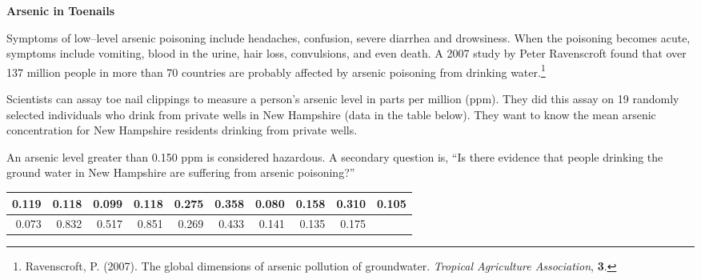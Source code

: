 \def\theTopic{Arsenic}
\def\dayNum{15 }

\begin{center}
{\bf {\large Arsenic in Toenails}}
\end{center}

 Symptoms of low--level  arsenic poisoning
include headaches, confusion, severe diarrhea and
drowsiness.  When the poisoning becomes acute, symptoms include
vomiting, blood in the urine, hair loss, convulsions, and even death.
A 2007 study by Peter Ravenscroft found that over 137 million people
in more than 70 countries are probably affected by arsenic poisoning
from drinking water.\footnote{Ravenscroft, P. (2007). The global
  dimensions of arsenic pollution of groundwater. {\em Tropical
    Agriculture Association}, {\bf 3}.}

Scientists can assay toe nail clippings to measure a person's arsenic
level in parts per million (ppm).  They did this assay on 19 randomly selected 
individuals who drink from private wells in New Hampshire (data in the
table below). They want to know  the mean arsenic 
concentration for New Hampshire residents drinking from private wells.

 An arsenic level greater than 0.150 ppm is considered
hazardous. A secondary question is, ``Is there evidence that people
drinking the ground water in New Hampshire are suffering from arsenic
poisoning?''


\begin{center}
\begin{tabular}{|r|r|r|r|r|r|r|r|r|r|} \hline
0.119& 0.118& 0.099& 0.118& 0.275& 0.358& 0.080& 0.158& 0.310& 0.105
\\ \hline
0.073& 0.832& 0.517& 0.851& 0.269& 0.433& 0.141& 0.135& 0.175 & \\ \hline
\end{tabular}  
\end{center}


